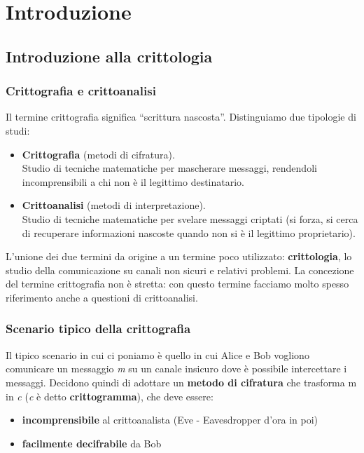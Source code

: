 \part{Introduzione}
\chapter{Introduzione alla crittologia}
\section{Crittografia e crittoanalisi}
Il termine crittografia significa “scrittura nascosta”. Distinguiamo due tipologie di studi:
\begin{itemize}
	\item \textbf{Crittografia} (metodi di cifratura).\\
	Studio di tecniche matematiche per mascherare messaggi, rendendoli incomprensibili a chi non è il legittimo destinatario.
	\item \textbf{Crittoanalisi} (metodi di interpretazione).\\
	Studio di tecniche matematiche per svelare messaggi criptati (si forza, si cerca di recuperare informazioni nascoste quando non si è il legittimo proprietario).
\end{itemize}
\noindent L’unione dei due termini da origine a un termine poco utilizzato: \textbf{crittologia}, lo studio della comunicazione su canali non sicuri e relativi problemi. La concezione del termine crittografia non è stretta: con questo termine facciamo molto spesso riferimento anche a questioni di crittoanalisi. 

\section{Scenario tipico della crittografia}
Il tipico scenario in cui ci poniamo è quello in cui Alice e Bob vogliono comunicare un messaggio \emph{m} su un canale insicuro dove è possibile intercettare i messaggi. Decidono quindi di adottare un \textbf{metodo di cifratura} che trasforma m in \emph{c} (\emph{c} è detto \textbf{crittogramma}), che deve essere:
\begin{itemize}
    \item \textbf{incomprensibile} al crittoanalista (Eve - Eavesdropper d'ora in poi)
    \item \textbf{facilmente decifrabile} da Bob
\end{itemize}

